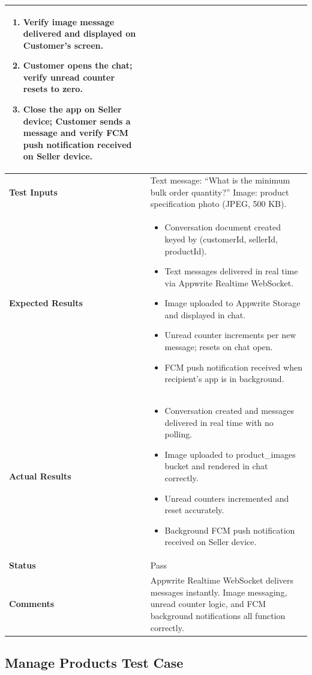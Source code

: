 \begin{table}[H]
\begin{tabular}{|p{3.2cm}|p{10.8cm}|}
\begin{enumerate}[leftmargin=*,noitemsep]
\item Verify image message delivered and displayed on Customer's screen.
\item Customer opens the chat; verify unread counter resets to zero.
\item Close the app on Seller device; Customer sends a message and verify FCM push notification received on Seller device.
\end{enumerate} \\ \hline
\textbf{Test Inputs} & Text message: ``What is the minimum bulk order quantity?'' Image: product specification photo (JPEG, 500 KB). \\ \hline
\textbf{Expected Results} &
\begin{itemize}[leftmargin=*,noitemsep]
\item Conversation document created keyed by (customerId, sellerId, productId).
\item Text messages delivered in real time via Appwrite Realtime WebSocket.
\item Image uploaded to Appwrite Storage and displayed in chat.
\item Unread counter increments per new message; resets on chat open.
\item FCM push notification received when recipient's app is in background.
\end{itemize} \\ \hline
\textbf{Actual Results} &
\begin{itemize}[leftmargin=*,noitemsep]
\item Conversation created and messages delivered in real time with no polling.
\item Image uploaded to product\_images bucket and rendered in chat correctly.
\item Unread counters incremented and reset accurately.
\item Background FCM push notification received on Seller device.
\end{itemize} \\ \hline
\textbf{Status} & Pass \\ \hline
\textbf{Comments} & Appwrite Realtime WebSocket delivers messages instantly. Image messaging, unread counter logic, and FCM background notifications all function correctly. \\ \hline
\end{tabular}
\end{table}

\newpage
\subsection{Manage Products Test Case}

